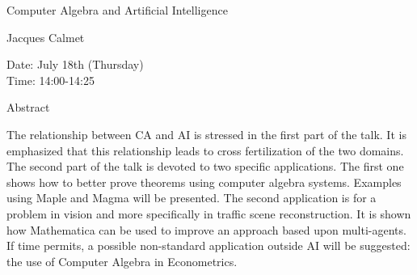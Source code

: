 \begin{center}
\LARGE
Computer Algebra and Artificial Intelligence 

\end{center}

\begin{center}
\Large
Jacques Calmet

\end{center}

\noindent
Date:  July 18th (Thursday)\\
Time:  14:00-14:25\\

\begin{center}
\large
Abstract
\end{center}

The relationship between CA and AI is stressed in the first part of the talk. It is emphasized that
this relationship leads to cross fertilization of the two domains. The second part of the talk is
devoted to two specific applications. The first one shows how to better prove theorems using
computer algebra systems. Examples using Maple and Magma will be presented. The second
application is for a problem in vision and more specifically in traffic scene reconstruction. It is
shown how Mathematica can be used to improve an approach based upon multi-agents. If time
permits, a possible non-standard application outside AI will be suggested: the use of Computer
Algebra in Econometrics. 

